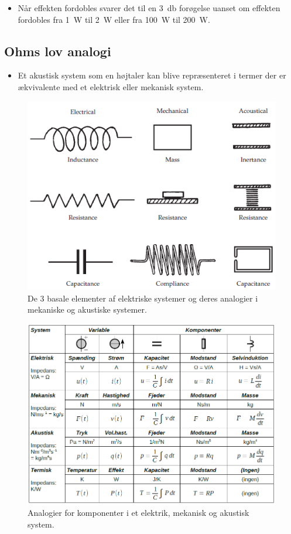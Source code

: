 \begin{itemize}
	\item Når effekten fordobles svarer det til en \SI{3}{\decibel} forøgelse uanset om effekten fordobles fra \SI{1}{\watt} til \SI{2}{\watt} eller fra \SI{100}{\watt} til \SI{200}{\watt}.
\end{itemize}

\subsection{Ohms lov analogi}
\begin{itemize}
	\item Et akustisk system som en højtaler kan blive repræsenteret i termer der er ækvivalente med et elektrisk eller mekanisk system. 
\end{itemize}

\begin{figure} [H]
	\centering
	\includegraphics[width=0.5\linewidth]{graphics/4.png}
	\caption{De 3 basale elementer af elektriske systemer og deres analogier i mekaniske og akustiske systemer.}
	\label{fig:4}
\end{figure}

\begin{figure} [H]
	\centering
	\includegraphics[width=\linewidth]{graphics/5.png}
	\caption{Analogier for komponenter i et elektrik, mekanisk og akustisk system.}
	\label{fig:5}
\end{figure}

